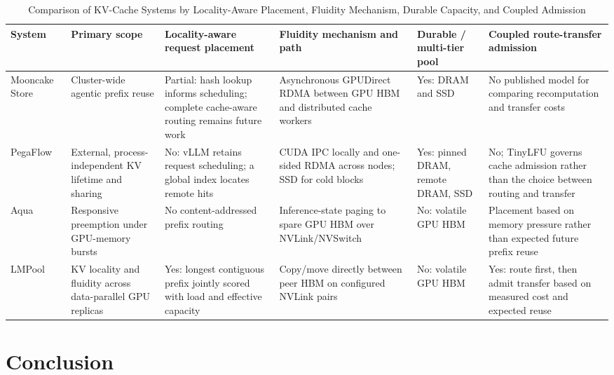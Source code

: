 \documentclass{article}
\newcommand{\sys}{LMPool}
\begin{document}
\begin{table}[t]
  \caption{Comparison of KV-Cache Systems by Locality-Aware Placement, Fluidity Mechanism, Durable Capacity, and Coupled Admission}
  \label{tab:related-principles}
  \centering
  \small
  \setlength{\tabcolsep}{3pt}
  \begin{tabular}{L{0.12\textwidth}L{0.15\textwidth}L{0.17\textwidth}L{0.20\textwidth}L{0.12\textwidth}L{0.17\textwidth}}
    \toprule
    System & Primary scope & Locality-aware request placement & Fluidity mechanism and path & Durable / multi-tier pool & Coupled route-transfer admission \\
    \midrule
    Mooncake Store~\citep{MooncakeStore}
      & Cluster-wide agentic prefix reuse
      & Partial: hash lookup informs scheduling; complete cache-aware routing remains future work
      & Asynchronous GPUDirect RDMA between GPU HBM and distributed cache workers
      & Yes: DRAM and SSD
      & No published model for comparing recomputation and transfer costs \\
    PegaFlow~\citep{PegaFlow}
      & External, process-independent KV lifetime and sharing
      & No: vLLM retains request scheduling; a global index locates remote hits
      & CUDA IPC locally and one-sided RDMA across nodes; SSD for cold blocks
      & Yes: pinned DRAM, remote DRAM, SSD
      & No; TinyLFU governs cache admission rather than the choice between routing and transfer \\
    Aqua~\citep{Aqua}
      & Responsive preemption under GPU-memory bursts
      & No content-addressed prefix routing
      & Inference-state paging to spare GPU HBM over NVLink/NVSwitch
      & No: volatile GPU HBM
      & Placement based on memory pressure rather than expected future prefix reuse \\
    \sys{}
      & KV locality and fluidity across data-parallel GPU replicas
      & Yes: longest contiguous prefix jointly scored with load and effective capacity
      & Copy/move directly between peer HBM on configured NVLink pairs
      & No: volatile GPU HBM
      & Yes: route first, then admit transfer based on measured cost and expected reuse \\
    \bottomrule
  \end{tabular}
\end{table}

\section{Conclusion}
\label{sec:concl}
\end{document}
